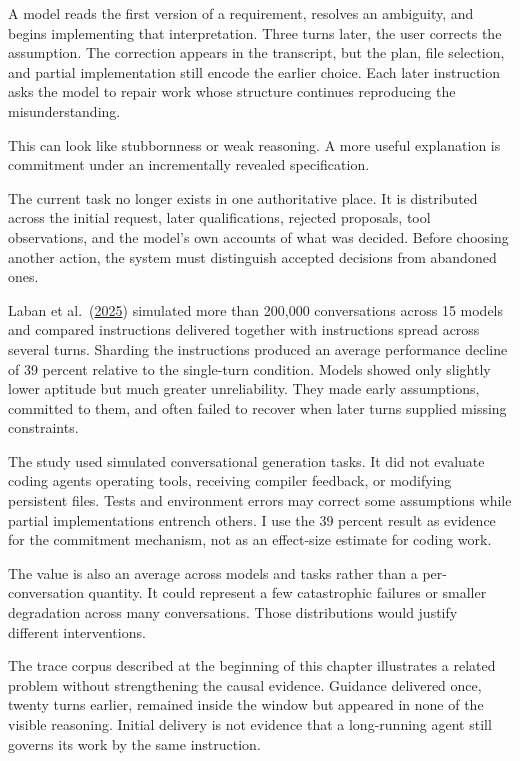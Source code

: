 A model reads the first version of a requirement, resolves an ambiguity, and begins implementing that interpretation. Three turns later, the user corrects the assumption. The correction appears in the transcript, but the plan, file selection, and partial implementation still encode the earlier choice. Each later instruction asks the model to repair work whose structure continues reproducing the misunderstanding.

This can look like stubbornness or weak reasoning. A more useful explanation is commitment under an incrementally revealed specification.

The current task no longer exists in one authoritative place. It is distributed across the initial request, later qualifications, rejected proposals, tool observations, and the model's own accounts of what was decided. Before choosing another action, the system must distinguish accepted decisions from abandoned ones.

Laban et al.~(\href{https://arxiv.org/abs/2505.06120}{2025}) simulated more than 200,000 conversations across 15 models and compared instructions delivered together with instructions spread across several turns. Sharding the instructions produced an average performance decline of 39 percent relative to the single-turn condition. Models showed only slightly lower aptitude but much greater unreliability. They made early assumptions, committed to them, and often failed to recover when later turns supplied missing constraints.

The study used simulated conversational generation tasks. It did not evaluate coding agents operating tools, receiving compiler feedback, or modifying persistent files. Tests and environment errors may correct some assumptions while partial implementations entrench others. I use the 39 percent result as evidence for the commitment mechanism, not as an effect-size estimate for coding work.

The value is also an average across models and tasks rather than a per-conversation quantity. It could represent a few catastrophic failures or smaller degradation across many conversations. Those distributions would justify different interventions.

The trace corpus described at the beginning of this chapter illustrates a related problem without strengthening the causal evidence. Guidance delivered once, twenty turns earlier, remained inside the window but appeared in none of the visible reasoning. Initial delivery is not evidence that a long-running agent still governs its work by the same instruction.


